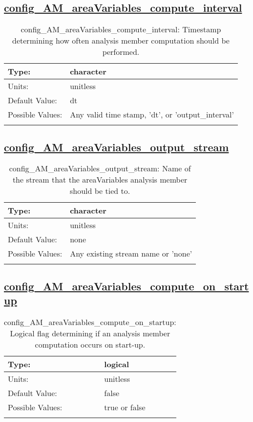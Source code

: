 \subsection[config\_AM\_areaVariables\_compute\_interval]{\hyperref[sec:nm_tab_AM_areaVariables]{config\_AM\_areaVariables\_compute\_interval}}
\label{subsec:nm_sec_config_AM_areaVariables_compute_interval}
\begin{center}
\begin{longtable}{| p{2.0in} || p{4.0in} |}
    \hline
    Type: & character \\
    \hline
    Units: & \si{unitless} \\
    \hline
    Default Value: & dt \\
    \hline
    Possible Values: & Any valid time stamp, 'dt', or 'output\_interval' \\
    \hline
    \caption{config\_AM\_areaVariables\_compute\_interval: Timestamp determining how often analysis member computation should be performed.}
\end{longtable}
\end{center}
\subsection[config\_AM\_areaVariables\_output\_stream]{\hyperref[sec:nm_tab_AM_areaVariables]{config\_AM\_areaVariables\_output\_stream}}
\label{subsec:nm_sec_config_AM_areaVariables_output_stream}
\begin{center}
\begin{longtable}{| p{2.0in} || p{4.0in} |}
    \hline
    Type: & character \\
    \hline
    Units: & \si{unitless} \\
    \hline
    Default Value: & none \\
    \hline
    Possible Values: & Any existing stream name or 'none' \\
    \hline
    \caption{config\_AM\_areaVariables\_output\_stream: Name of the stream that the areaVariables analysis member should be tied to.}
\end{longtable}
\end{center}
\subsection[config\_AM\_areaVariables\_compute\_on\_startup]{\hyperref[sec:nm_tab_AM_areaVariables]{config\_AM\_areaVariables\_compute\_on\_startup}}
\label{subsec:nm_sec_config_AM_areaVariables_compute_on_startup}
\begin{center}
\begin{longtable}{| p{2.0in} || p{4.0in} |}
    \hline
    Type: & logical \\
    \hline
    Units: & \si{unitless} \\
    \hline
    Default Value: & false \\
    \hline
    Possible Values: & true or false \\
    \hline
    \caption{config\_AM\_areaVariables\_compute\_on\_startup: Logical flag determining if an analysis member computation occurs on start-up.}
\end{longtable}
\end{center}
